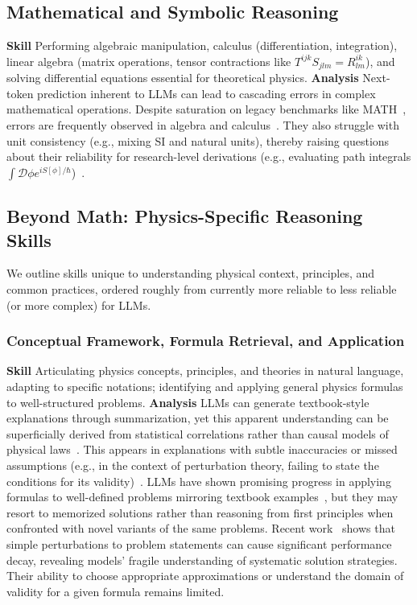 \subsection{Mathematical and Symbolic Reasoning}
\label{sec:math_skills_physics}
\textbf{Skill} Performing algebraic manipulation, calculus (differentiation, integration), linear algebra (matrix operations, tensor contractions like $T^{ijk}S_{jlm} = R^{ik}_{lm}$), and solving differential equations essential for theoretical physics.
\textbf{Analysis} Next-token prediction inherent to LLMs can lead to cascading errors in complex mathematical operations. Despite saturation on legacy benchmarks like MATH~\cite{Hendrycks2021Measuring}, errors are frequently observed in algebra and calculus~\cite{Davis2025Testing,Davis2024Testing}. They also struggle with unit consistency (e.g., mixing SI and natural units), thereby raising questions about their reliability for research-level derivations (e.g., evaluating path integrals $\int \mathcal{D}\phi e^{iS[\phi]/\hbar}$)~\cite{Pan2025Quantum}.

\subsection{Beyond Math: Physics-Specific Reasoning Skills}
\label{sec:physics_specific_skills}
We outline skills unique to understanding physical context, principles, and common practices, ordered roughly from currently more reliable to less reliable (or more complex) for LLMs.
\subsubsection{Conceptual Framework, Formula Retrieval, and Application}
\label{sec:skill_conceptual_formula}
\textbf{Skill} Articulating physics concepts, principles, and theories in natural language, adapting to specific notations; identifying and applying general physics formulas to well-structured problems.
\textbf{Analysis} LLMs can generate textbook-style explanations through summarization, yet this apparent understanding can be superficially derived from statistical correlations rather than causal models of physical laws~\cite{Hagendorff2024Machine,Schaeffer2023Are}. This appears in explanations with subtle inaccuracies or missed assumptions (e.g., in the context of perturbation theory, failing to state the conditions for its validity)~\cite{Zhang2023Sirens}. LLMs have shown promising progress in applying formulas to well-defined problems mirroring textbook examples~\cite{Qiu2025PHYBench,Lewkowycz2022Solving,Zhang2025PhysReason}, but they may resort to memorized solutions rather than reasoning from first principles when confronted with novel variants of the same problems. Recent work~\cite{Srivastava2022Imitation,Wu2024Reasoning,Huang2025MATHPerturb} shows that simple perturbations to problem statements can cause significant performance decay, revealing models' fragile understanding of systematic solution strategies. Their ability to choose appropriate approximations or understand the domain of validity for a given formula remains limited.
